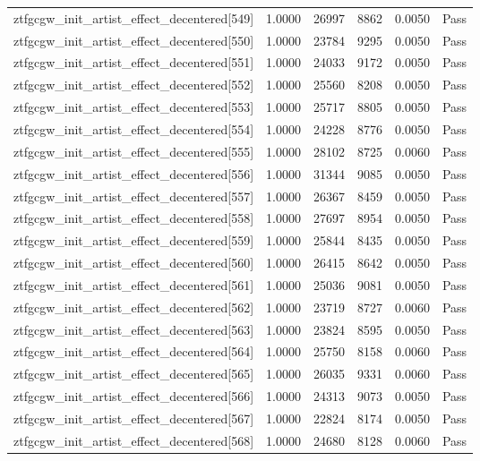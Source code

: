 \begin{table}[htbp]
\begin{tabular}{llrrll}
ztfgcgw\_init\_artist\_effect\_decentered[549] & 1.0000 & 26997 & 8862 & 0.0050 & Pass \\
ztfgcgw\_init\_artist\_effect\_decentered[550] & 1.0000 & 23784 & 9295 & 0.0050 & Pass \\
ztfgcgw\_init\_artist\_effect\_decentered[551] & 1.0000 & 24033 & 9172 & 0.0050 & Pass \\
ztfgcgw\_init\_artist\_effect\_decentered[552] & 1.0000 & 25560 & 8208 & 0.0050 & Pass \\
ztfgcgw\_init\_artist\_effect\_decentered[553] & 1.0000 & 25717 & 8805 & 0.0050 & Pass \\
ztfgcgw\_init\_artist\_effect\_decentered[554] & 1.0000 & 24228 & 8776 & 0.0050 & Pass \\
ztfgcgw\_init\_artist\_effect\_decentered[555] & 1.0000 & 28102 & 8725 & 0.0060 & Pass \\
ztfgcgw\_init\_artist\_effect\_decentered[556] & 1.0000 & 31344 & 9085 & 0.0050 & Pass \\
ztfgcgw\_init\_artist\_effect\_decentered[557] & 1.0000 & 26367 & 8459 & 0.0050 & Pass \\
ztfgcgw\_init\_artist\_effect\_decentered[558] & 1.0000 & 27697 & 8954 & 0.0050 & Pass \\
ztfgcgw\_init\_artist\_effect\_decentered[559] & 1.0000 & 25844 & 8435 & 0.0050 & Pass \\
ztfgcgw\_init\_artist\_effect\_decentered[560] & 1.0000 & 26415 & 8642 & 0.0050 & Pass \\
ztfgcgw\_init\_artist\_effect\_decentered[561] & 1.0000 & 25036 & 9081 & 0.0050 & Pass \\
ztfgcgw\_init\_artist\_effect\_decentered[562] & 1.0000 & 23719 & 8727 & 0.0060 & Pass \\
ztfgcgw\_init\_artist\_effect\_decentered[563] & 1.0000 & 23824 & 8595 & 0.0050 & Pass \\
ztfgcgw\_init\_artist\_effect\_decentered[564] & 1.0000 & 25750 & 8158 & 0.0060 & Pass \\
ztfgcgw\_init\_artist\_effect\_decentered[565] & 1.0000 & 26035 & 9331 & 0.0060 & Pass \\
ztfgcgw\_init\_artist\_effect\_decentered[566] & 1.0000 & 24313 & 9073 & 0.0050 & Pass \\
ztfgcgw\_init\_artist\_effect\_decentered[567] & 1.0000 & 22824 & 8174 & 0.0050 & Pass \\
ztfgcgw\_init\_artist\_effect\_decentered[568] & 1.0000 & 24680 & 8128 & 0.0060 & Pass \\

\end{tabular}
\end{table}
